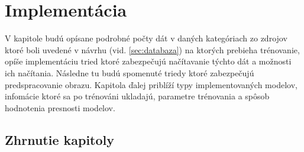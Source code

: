 
\chapter{Implementácia}

V kapitole budú opísane podrobné počty dát v daných kategóriach zo zdrojov ktoré boli uvedené v návrhu (vid. \ref{sec:databaza})
    na ktorých prebieha trénovanie, opíše implementáciu tried ktoré zabezpečujú načítavanie týchto dát a možnosti ich načítania.
Následne tu budú spomenuté triedy ktoré zabezpečujú predspracovanie obrazu.
Kapitola ďalej priblíží typy implementovaných modelov, infomácie ktoré sa po trénováni ukladajú, parametre trénovania a spôsob hodnotenia presnosti modelov.









\section{Zhrnutie kapitoly}

